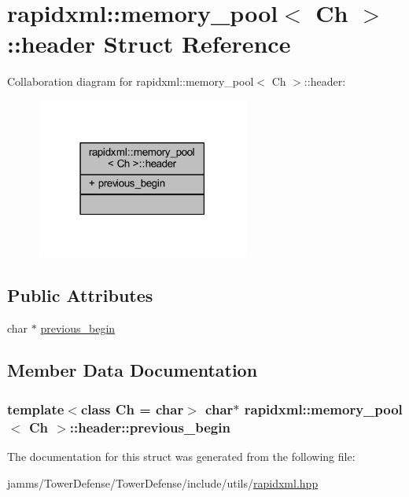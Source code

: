 \hypertarget{structrapidxml_1_1memory__pool_1_1header}{\section{rapidxml\+:\+:memory\+\_\+pool$<$ Ch $>$\+:\+:header Struct Reference}
\label{structrapidxml_1_1memory__pool_1_1header}
}


Collaboration diagram for rapidxml\+:\+:memory\+\_\+pool$<$ Ch $>$\+:\+:header\+:\nopagebreak
\begin{figure}[H]
\begin{center}
\leavevmode
\includegraphics[width=198pt]{structrapidxml_1_1memory__pool_1_1header__coll__graph}
\end{center}
\end{figure}
\subsection*{Public Attributes}
\begin{DoxyCompactItemize}
\item 
char $\ast$ \hyperlink{structrapidxml_1_1memory__pool_1_1header_a3035f6741bb38f91c7f2efd05398c23d}{previous\+\_\+begin}
\end{DoxyCompactItemize}


\subsection{Member Data Documentation}
\hypertarget{structrapidxml_1_1memory__pool_1_1header_a3035f6741bb38f91c7f2efd05398c23d}{
\subsubsection[{previous\+\_\+begin}]{\setlength{\rightskip}{0pt plus 5cm}template$<$class Ch  = char$>$ char$\ast$ {\bf rapidxml\+::memory\+\_\+pool}$<$ Ch $>$\+::header\+::previous\+\_\+begin}}\label{structrapidxml_1_1memory__pool_1_1header_a3035f6741bb38f91c7f2efd05398c23d}


The documentation for this struct was generated from the following file\+:\begin{DoxyCompactItemize}
\item 
jamms/\+Tower\+Defense/\+Tower\+Defense/include/utils/\hyperlink{rapidxml_8hpp}{rapidxml.\+hpp}\end{DoxyCompactItemize}
